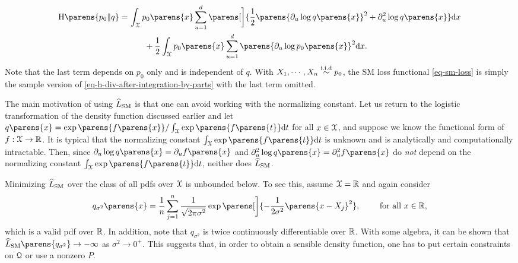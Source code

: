 \begin{align}
	\Hdiv \parens{p_0 \Vert q} = & \, \int_{\calX} p_0 \parens{x} \sum_{u=1}^d \parens[\bigg]{ \frac{1}{2} \parens{\partial_u \log q \parens{x}}^2 +\partial_u^2 \log q \parens{x}} \diff x \nonumber \\ 
	& \qquad + \frac{1}{2} \int_{\calX} p_0 \parens{x} \sum_{u=1}^d \parens{\partial_u \log p_0 \parens{x}}^2 \diff x. \label{eq-h-div-after-integration-by-parts}
\end{align}
Note that the last term depends on $p_0$ only and is independent of $q$. With $X_1, \cdots, X_n \iid p_0$, the SM loss functional \eqref{eq-sm-loss} is simply the sample version of \eqref{eq-h-div-after-integration-by-parts} with the last term omitted. 

The main motivation of using $\widehat{L}_{\mathrm{SM}}$ is that one can avoid working with the normalizing constant. Let us return to the logistic transformation of the density function discussed earlier and let $q \parens{x} = \exp \parens{f \parens{x}} / \int_{\calX} \exp \parens{f \parens{t}} \diff t$ for all $x \in \mathcal{X}$, and suppose we know the functional form of $f: \mathcal{X} \to \mathbb{R}$. It is typical that the normalizing constant $\int_{\calX} \exp \parens{f \parens{t}} \diff t$ is unknown and is analytically and computationally intractable. Then, since $\partial_u \log q \parens{x} = \partial_u f \parens{x}$ and $\partial_u^2 \log q \parens{x} = \partial_u^2 f \parens{x}$ do \emph{not} depend on the normalizing constant $\int_{\calX} \exp \parens{f \parens{t}} \diff t$, neither does $\widehat{L}_{\mathrm{SM}}$. 

Minimizing $\widehat{L}_{\mathrm{SM}}$ over the class of all pdfs over $\mathcal{X}$ is unbounded below. To see this, assume $\mathcal{X} = \mathbb{R}$ and again consider 
\begin{align*}
	q_{\sigma^2} \parens{x} = \frac{1}{n} \sum_{j=1}^n \frac{1}{\sqrt{2 \pi \sigma^2}} \exp \parens[\bigg]{-\frac{1}{2\sigma^2} \parens{x - X_j}^2}, \qquad \text{ for all } x \in \Real, 
\end{align*}
which is a valid pdf over $\mathbb{R}$. In addition, note that $q_{\sigma^2}$ is twice continuously differentiable over $\mathbb{R}$. With some algebra, it can be shown that $\widehat{L}_{\SM} \parens{q_{\sigma^2}} \to -\infty$ as $\sigma^2 \to 0^+$. This suggests that, in order to obtain a sensible density function, one has to put certain constraints on $\mathcal{Q}$ or use a nonzero $P$. 

